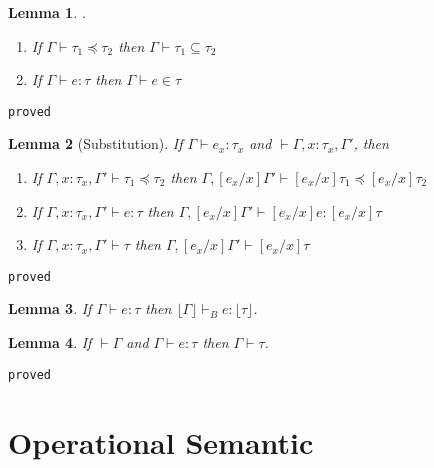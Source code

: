 \documentclass[10pt,a4paper]{article}
\newtheorem{lemma}{Lemma}
\newcommand\showproof[1]{\texttt{proved}}
\newcommand\sub[2]{\ensuremath{\left[ #2 / #1 \right]}}
\newcommand\erase[1]{\ensuremath{\lfloor #1 \rfloor}}
\newcommand\hastype[3]{\ensuremath{#1 \vdash #2 \colon #3}}
\newcommand\hastypebase[3]{\ensuremath{#1 \vdash_B #2 \colon #3}}
\newcommand\shastype[3]{\ensuremath{#1 \vdash #2 \in #3}}
\newcommand\iswellformed[2]{\ensuremath{#1 \vdash #2}}
\newcommand\issubtype[3]{\ensuremath{#1 \vdash #2 \preceq #3}}
\newcommand\sissubtype[3]{\ensuremath{#1 \vdash #2 \subseteq #3}}
\begin{document}
\begin{lemma}.
\begin{enumerate}
\item If \issubtype{\Gamma}{\tau_1}{\tau_2} then \sissubtype{\Gamma}{\tau_1}{\tau_2} 
\item If \hastype{\Gamma}{e}{\tau} then \shastype{\Gamma}{e}{\tau} 
\end{enumerate}
\end{lemma}
\showproof{
	\begin{proof}
	
	\end{proof}
}


\begin{lemma}[Substitution]\label{lemma:substitution}
If \hastype{\Gamma}{e_x}{\tau_x} and \iswellformed{}{\Gamma, x\colon\tau_x ,\Gamma'}, then 
\begin{enumerate}
\item If 
	\issubtype{\Gamma, x\colon\tau_x, \Gamma'}{\tau_1}{\tau_2}
	then
	\issubtype{\Gamma, \sub{x}{e_x}\Gamma'}{\sub{x}{e_x}\tau_1}{\sub{x}{e_x}\tau_2}
\item If 
	\hastype{\Gamma, x\colon\tau_x, \Gamma'}{e}{\tau}
	then
	\hastype{\Gamma, \sub{x}{e_x}\Gamma'}{\sub{x}{e_x}e}{\sub{x}{e_x}\tau}
\item If 
	\iswellformed{\Gamma, x\colon\tau_x, \Gamma'}{\tau}
	then
	\iswellformed{\Gamma, \sub{x}{e_x}\Gamma'}{\sub{x}{e_x}\tau}
\end{enumerate}
\end{lemma}
\showproof{
	\begin{proof}
	
	\end{proof}
}

\begin{lemma}\label{lemma:erase} %
If \hastype{\Gamma}{e}{\tau} 
then \hastypebase{\erase{\Gamma}}{e}{\erase{\tau}}.
\end{lemma}


\begin{lemma}\label{lemma:wellformed}
If \iswellformed{}{\Gamma} and \hastype{\Gamma}{e}{\tau} then \iswellformed{\Gamma}{\tau}.
\end{lemma}
\showproof{
	\begin{proof}
	
	\end{proof}
}

\section*{Operational Semantic}
\end{document}
